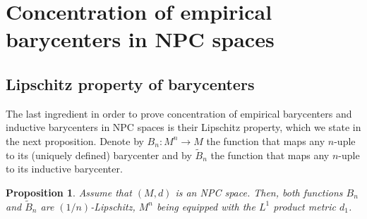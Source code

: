 \documentclass[10pt,a4paper]{article}
\theoremstyle{plain}
\newtheorem{proposition}[theorem]{Proposition}
\theoremstyle{definition}
\theoremstyle{remark}
\begin{document}
\section{Concentration of empirical barycenters in NPC spaces}\label{sec:main}

\subsection{Lipschitz property of barycenters} \label{subsec:Lip}

The last ingredient in order to prove concentration of empirical barycenters and inductive barycenters in NPC spaces is their Lipschitz property, which we state in the next proposition. Denote by $B_n:M^n\to M$ the function that maps any $n$-uple to its (uniquely defined) barycenter and by $\tilde B_n$ the function that maps any $n$-uple to its inductive barycenter.

\begin{proposition}\label{baryarelip}
Assume that $(M,d)$ is an NPC space. Then, both functions $B_n$ and $\tilde B_n$ are $(1/n)$-Lipschitz, $M^n$ being equipped with the $L^1$ product metric $d_1$. 
\end{proposition}
\end{document}
